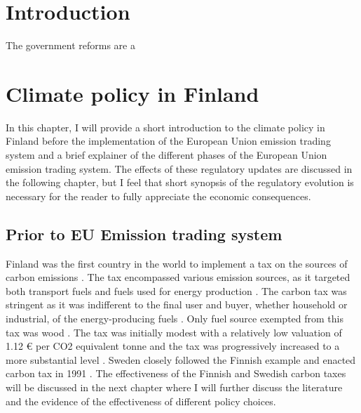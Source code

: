 \documentclass[
  12pt,
  a4paper,
]{report}
\begin{document}
{
\setcounter{tocdepth}{1}
\tableofcontents
}
\hypertarget{intro}{%
\chapter{Introduction}\label{intro}}

The government reforms are a

\hypertarget{clipolfi}{%
\chapter{Climate policy in Finland}\label{clipolfi}}

In this chapter, I will provide a short introduction to the climate policy in Finland before the implementation of the European Union emission trading system and a brief explainer of the different phases of the European Union emission trading system. The effects of these regulatory updates are discussed in the following chapter, but I feel that short synopsis of the regulatory evolution is necessary for the reader to fully appreciate the economic consequences.

\hypertarget{preeuclipol}{%
\section{Prior to EU Emission trading system}\label{preeuclipol}}

Finland was the first country in the world to implement a tax on the sources of carbon emissions \citep{hallitus1989, bavbek2016}. The tax encompassed various emission sources, as it targeted both transport fuels and fuels used for energy production \citep{lin2011,ekins1999}. The carbon tax was stringent as it was indifferent to the final user and buyer, whether household or industrial, of the energy-producing fuels \citep{ekins1999}. Only fuel source exempted from this tax was wood \citep{elbaum2021}. The tax was initially modest with a relatively low valuation of 1.12 € per CO2 equivalent tonne and the tax was progressively increased to a more substantial level \citep{bavbek2016}. Sweden closely followed the Finnish example and enacted carbon tax in 1991 \citep{andersson2019}. The effectiveness of the Finnish and Swedish carbon taxes will be discussed in the next chapter where I will further discuss the literature and the evidence of the effectiveness of different policy choices.
\end{document}
